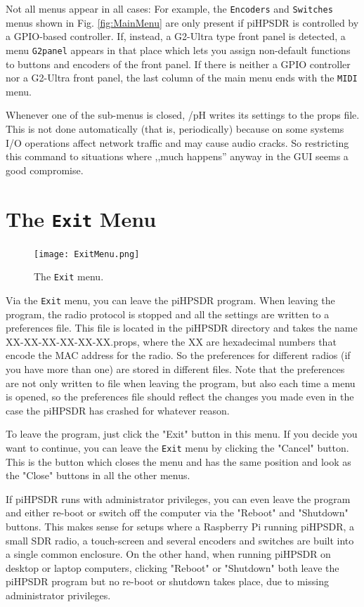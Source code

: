 \documentclass[12pt]{book}
\def\bltt#1{\texttt{\color{blue}#1}}
\def\pH{pi\-HPSDR\xspace}
\begin{document}
Not all menus appear in all cases: For example, the \bltt{Encoders} and \bltt{Switches}
menus shown in Fig. \ref{fig:MainMenu} are only present if \pH is controlled by
a GPIO-based controller. If, instead, a G2-Ultra type front panel is detected, a menu
\bltt{G2panel} appears in that place which lets you assign non-default functions to
buttons and encoders of the front panel. If there is neither a GPIO controller nor
a G2-Ultra front panel, the last column of the main menu ends with the \bltt{MIDI}
menu.

Whenever one of the sub-menus is closed, /pH writes its settings to the props file. This is not done
automatically (that is, periodically) because on some systems I/O operations affect
network traffic and may cause audio cracks. So restricting this command to situations
where ,,much happens'' anyway in the GUI seems a good compromise.
\section{The \texttt{Exit} Menu}

\begin{figure}[ht]
\center
\texttt{[image: ExitMenu.png]}
\caption{The \bltt{Exit} menu.}
\end{figure}

Via the \bltt{Exit} menu, you can leave the \pH program. When leaving the program,
the radio protocol is stopped and all the settings are written to a preferences file. This
file is located in the \pH directory and takes the name XX-XX-XX-XX-XX-XX.props, where
the XX are hexadecimal numbers that encode the MAC address for the radio.
So the preferences for different radios (if you
have more than one) are stored in different files.
Note that the preferences are not only written to file when leaving the program, but also each
time a menu is opened, so the preferences file should reflect the changes you made even in the
case the \pH has crashed for whatever reason.

To leave the program, just click the
"Exit" button in this menu. If you decide you want to continue, you can leave the \bltt{Exit}
menu by clicking the "Cancel" button. This is the button which closes the menu and has
the same position and look as the "Close" buttons in all the other menus.

If \pH runs with administrator privileges, you can even leave the program and either re-boot
or switch off the computer via the "Reboot" and "Shutdown" buttons. This makes sense for setups
where a Raspberry Pi running \pH, a small SDR radio, a touch-screen and several encoders
and switches are built into a single common enclosure. On the other hand, when running
\pH on desktop or laptop computers, clicking "Reboot" or "Shutdown" both leave the \pH
program but no re-boot or shutdown takes place, due to missing administrator privileges.
\end{document}
